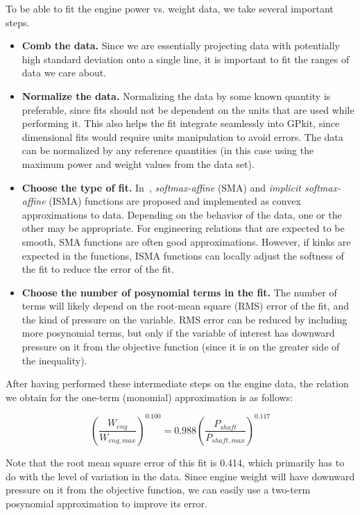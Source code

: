 To be able to fit the engine power vs. weight data, we take several important steps.
\begin{itemize}
    \item \textbf{Comb the data.} Since we are essentially projecting
    data with potentially high standard deviation onto a single line,
    it is important to fit the ranges of data we care about.
    \item \textbf{Normalize the data.} Normalizing the data
    by some known quantity is preferable, since fits should not be dependent on the
    units that are used while performing it. This also helps the fit integrate
    seamlessly into GPkit, since dimensional fits would require units manipulation
    to avoid errors. The data can be normalized by any
    reference quantities (in this case using the maximum power and weight values
    from the data set).
    \item \textbf{Choose the type of fit.} In~\cite{gpfitpaper}, \textit{softmax-affine}
    (SMA) and \textit{implicit softmax-affine} (ISMA)
    functions are proposed and implemented as convex approximations
    to data. Depending on the behavior of the data, one or the other
    may be appropriate. For engineering relations that are expected to be smooth, SMA
    functions are often good approximations. However, if kinks are expected in the
    functions, ISMA functions can locally adjust the softness of the fit to
    reduce the error of the fit.
    \item \textbf{Choose the number of posynomial terms in the fit.} The number of
    terms will likely depend on the root-mean square (RMS) error of the fit, and
    the kind of pressure on the variable. RMS error can be reduced by including
    more posynomial terms, but only if the variable of interest has downward
    pressure on it from the objective function (since it is on the greater side
    of the inequality).
\end{itemize}

After having performed these intermediate steps on the engine data,
the relation we obtain for the one-term (monomial) approximation is as follows:

\begin{equation}
    \left(\frac{W_{eng}}{W_{eng,max}}\right)^{0.100} = 0.988 \left(\frac{P_{shaft}}{P_{shaft,max}}\right)^{0.117}
\end{equation}

Note that the root mean square error of this fit is 0.414, which primarily has to do with
the level of variation in the data. Since engine weight will have downward pressure
on it from the objective function, we can easily use a two-term posynomial approximation to
improve its error.

